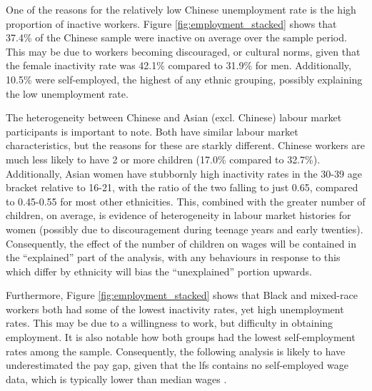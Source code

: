 \documentclass[class=article, crop=false]{standalone}
\begin{document}
One of the reasons for the relatively low Chinese unemployment rate is the high proportion of inactive workers. Figure \ref{fig:employment_stacked} shows that 37.4\% of the Chinese sample were inactive on average over the sample period. This may be due to workers becoming discouraged, or cultural norms, given that the female inactivity rate was 42.1\% compared to 31.9\% for men. Additionally, 10.5\% were self-employed, the highest of any ethnic grouping, possibly explaining the low unemployment rate.

The heterogeneity between Chinese and Asian (excl. Chinese) labour market participants is important to note. Both have similar labour market characteristics, but the reasons for these are starkly different. Chinese workers are much less likely to have 2 or more children (17.0\% compared to 32.7\%). Additionally, Asian women have stubbornly high inactivity rates in the 30-39 age bracket relative to 16-21, with the ratio of the two falling to just 0.65, compared to 0.45-0.55 for most other ethnicities. This, combined with the greater number of children, on average, is evidence of heterogeneity in labour market histories for women (possibly due to discouragement during teenage years and early twenties). Consequently, the effect of the number of children on wages will be contained in the \enquote{explained} part of the analysis, with any behaviours in response to this which differ by ethnicity will bias the \enquote{unexplained} portion upwards.

Furthermore, Figure \ref{fig:employment_stacked} shows that Black and mixed-race workers both had some of the lowest inactivity rates, yet high unemployment rates. This may be due to a willingness to work, but difficulty in obtaining employment. It is also notable how both groups had the lowest self-employment rates among the sample. Consequently, the following analysis is likely to have underestimated the pay gap, given that the \acrshort{lfs} contains no self-employed wage data, which is typically lower than median wages \citep{GOVf}.

\end{document}
